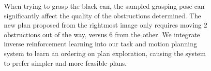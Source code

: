 \begin{figure}[t]
  \caption{\small{When trying to grasp the black can, the sampled grasping pose can
      significantly affect the quality of the obstructions determined. The new plan proposed from the rightmost image only
      requires moving 2 obstructions out of the way, versus 6 from the other. We integrate inverse reinforcement learning into our task and
      motion planning system to learn an ordering on plan exploration, causing the system to prefer simpler and more feasible plans.}}
  \label{fig:hlsearch}
\end{figure}

